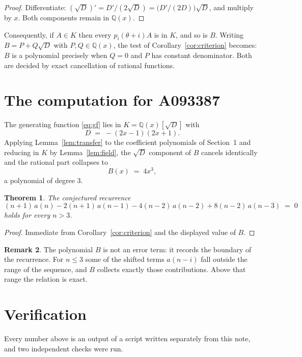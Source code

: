 \documentclass[11pt,a4paper]{article}
\theoremstyle{plain}
\newtheorem{theorem}{Theorem}
\theoremstyle{definition}
\newtheorem{remark}[theorem]{Remark}
\begin{document}
\begin{proof}
Differentiate: $(\sqrt{D})'=D'/(2\sqrt{D})=\bigl(D'/(2D)\bigr)\sqrt{D}$, and multiply by
$x$. Both components remain in $\mathbb{Q}(x)$.
\end{proof}

Consequently, if $A\in K$ then every $p_{i}(\theta+i)A$ is in $K$, and so is $B$. Writing
$B=P+Q\sqrt{D}$ with $P,Q\in\mathbb{Q}(x)$, the test of Corollary~\ref{cor:criterion}
becomes: $B$ is a polynomial precisely when $Q=0$ and $P$ has constant denominator. Both
are decided by exact cancellation of rational functions.

\section{The computation for A093387}

The generating function \eqref{eq:gf} lies in $K=\mathbb{Q}(x)[\sqrt{D}]$ with
\[
D \;=\; - \left(2 x - 1\right) \left(2 x + 1\right) .
\]
Applying Lemma~\ref{lem:transfer} to the coefficient polynomials of Section~1 and reducing
in $K$ by Lemma~\ref{lem:field}, the $\sqrt{D}$ component of $B$ cancels identically and
the rational part collapses to
\[
B(x)\;=\;4 x^{3} ,
\]
a polynomial of degree $3$.

\begin{theorem}
The conjectured recurrence
\[
(n + 1)\,a(n) -  2 \left(n + 1\right)\,a(n-1) -  4 \left(n - 2\right)\,a(n-2) + 8 \left(n - 2\right)\,a(n-3) \;=\;0
\]
holds for every $n>3$.
\end{theorem}

\begin{proof}
Immediate from Corollary~\ref{cor:criterion} and the displayed value of $B$.
\end{proof}

\begin{remark}
The polynomial $B$ is not an error term: it records the boundary of the recurrence. For
$n\le3$ some of the shifted terms $a(n-i)$ fall outside the range of the sequence,
and $B$ collects exactly those contributions. Above that range the relation is exact.
\end{remark}

\section{Verification}

Every number above is an output of a script written separately from this note, and two
independent checks were run.
\end{document}

